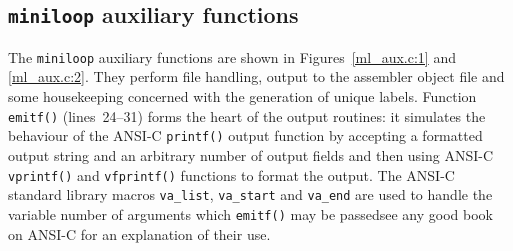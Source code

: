 \subsection{{\tt miniloop} auxiliary functions}

The {\tt miniloop} auxiliary functions are shown in
Figures~\ref{ml_aux.c:1} and \ref{ml_aux.c:2}. They perform file handling,
output to the assembler object file and some housekeeping concerned with the
generation of unique labels. Function \verb+emitf()+ 
(lines~24--31) forms the heart of the output routines: it simulates the
behaviour of  the ANSI-C {\tt printf()} output function by accepting a
formatted output string and an arbitrary number of output fields and
then using ANSI-C \verb+vprintf()+ and \verb+vfprintf()+ functions to
format the output. The ANSI-C standard library macros \verb|va_list|, \verb|va_start|
and \verb|va_end| are used to handle the variable number of arguments which \verb|emitf()|
may be passed\dash see any good book on ANSI-C for an explanation of their use.

